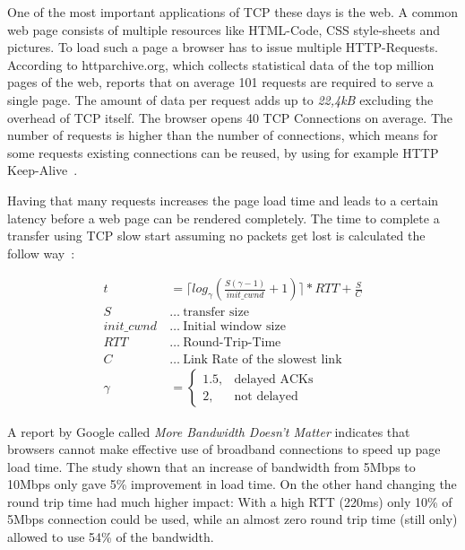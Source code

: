 One of the most important applications of TCP these days is the web. A common
web page consists of multiple resources like HTML-Code, CSS style-sheets and
pictures. To load such a page a browser has to issue multiple HTTP-Requests.
According to httparchive.org\cite{httparchive}, which collects statistical data
of the top million pages of the web, reports that on average 101 requests are
required to serve a single page\cite{httparchive-trends}. The amount of data per
request adds up to \emph{22,4kB} excluding the overhead of TCP itself. The
browser opens 40 TCP Connections on average. The number of requests is higher
than the number of connections, which means for some requests existing
connections can be reused, by using for example HTTP
Keep-Alive~\cite{I-D.thomson-hybi-http-timeout}.

Having that many requests increases the page load time and leads to a certain
latency before a web page can be rendered completely. The time to complete a
transfer using TCP slow start assuming no packets get lost is calculated the
follow way~\cite{832574}:

\begin{align}
  t&=\lceil log_{\gamma} (\frac{S(\gamma - 1)}{init\_cwnd} + 1) \rceil * RTT +
  \frac{S}{C} \label{loadtime}\\\label{transfer_time}
  S~&\dots~\text{transfer size } \\\nonumber
  init\_cwnd~&\dots~\text{Initial window size} \\\nonumber
  RTT~&\dots~\text{Round-Trip-Time} \\\nonumber
  C~&\dots~\text{Link Rate of the slowest link} \\\nonumber
\gamma &=\left\{\begin{array}{cl} 1.5, & \mbox{delayed ACKs}\\ 2, & \mbox{not delayed} \end{array}\right.
\end{align}

A report by Google called \emph{More Bandwidth Doesn't Matter}\cite{bandwith}
indicates that browsers cannot make effective use of broadband connections to
speed up page load time. The study shown that an increase of bandwidth from
5Mbps to 10Mbps only gave 5\% improvement in load time. On the other hand
changing the round trip time had much higher impact: With a high RTT (220ms)
only 10\% of 5Mbps connection could be used, while an almost zero round trip
time (still only) allowed to use 54\% of the bandwidth.

